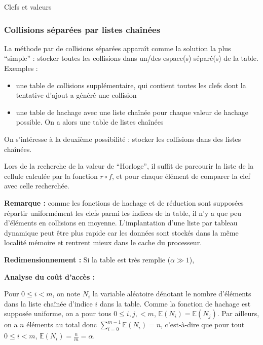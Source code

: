 \documentclass[../../../main.tex]{subfiles}
\begin{document}
\begin{definition}{Clefs et valeurs}
\subsubsection{Collisions séparées par listes chaînées}
La méthode par de collisions séparées apparaît comme la solution la plus ``simple'' : stocker toutes les collisions dans un/des espace(s) séparé(s) de la table. Exemples :
\begin{itemize}
	\item une table de collisions supplémentaire, qui contient toutes les clefs dont la tentative d'ajout a généré une collision
	\item une table de hachage avec une liste chaînée pour chaque valeur de hachage possible. On a alors une table de listes chaînées
\end{itemize}
On s'intéresse à la deuxième possibilité : stocker les collisions dans des listes chaînées.

\begin{minipage}{\textwidth}
	\begin{center}
		
	\end{center}
\end{minipage}

Lors de la recherche de la valeur de ``Horloge'', il suffit de parcourir la liste de la cellule calculée par la fonction $r\circ f$, et pour chaque élément de comparer la clef avec celle recherchée.

\textbf{Remarque :} comme les fonctions de hachage et de réduction sont supposées répartir uniformément les clefs parmi les indices de la table, il n'y a que peu d'éléments en collisions en moyenne. L'implantation d'une liste par tableau dynamique peut être plus rapide car les données sont stockés dans la même localité mémoire et rentrent mieux dans le cache du processeur.


\textbf{Redimensionnement :} Si la table est très remplie ($\alpha \gg 1$), 

\textbf{Analyse du coût d'accès :}

Pour $0\leq i < m$, on note $N_i$ la variable aléatoire dénotant le nombre d'éléments dans la liste chaînée d'indice $i$ dans la table. Comme la fonction de hachage est supposée uniforme, on a pour tous $0\leq i, j, < m$, $\mathbb{E}(N_i) = \mathbb{E}(N_j)$. Par ailleurs, on a $n$ éléments au total donc $\sum_{i = 0}^{m-1}\mathbb{E}(N_i) = n$, c'est-à-dire que pour tout $0\leq i < m$, $\mathbb{E}(N_i) = \frac{n}{m} = \alpha$.


\end{definition}
\end{document}
